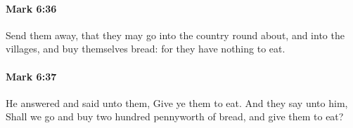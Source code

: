 		\paragraph{Mark 6:36} %
			\label{MARK-6-36}

			Send them away, that they may go into the country round about, and into the villages, and buy themselves bread: for they have nothing to eat.

			\begin{framed}
			\scriptsize
				\begin{compactdesc}
					\item[SBLG] 
				\end{compactdesc}
			\end{framed}

		\paragraph{Mark 6:37} %
			\label{MARK-6-37}

			He answered and said unto them, Give ye them to eat. And they say unto him, Shall we go and buy two hundred pennyworth of bread, and give them to eat?

